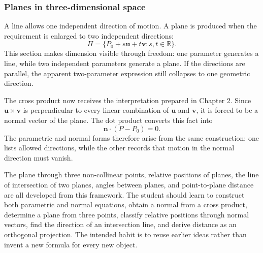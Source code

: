\subsubsection*{Planes in three-dimensional space}

A line allows one independent direction of motion. A plane is produced when the
requirement is enlarged to two independent directions:
\[
\Pi=\{P_0+s\mathbf u+t\mathbf v:s,t\in\mathbb R\}.
\]
This section makes dimension visible through freedom: one parameter generates a
line, while two independent parameters generate a plane. If the directions are
parallel, the apparent two-parameter expression still collapses to one geometric
direction.

The cross product now receives the interpretation prepared in Chapter 2. Since
$\mathbf u\times\mathbf v$ is perpendicular to every linear combination of
$\mathbf u$ and $\mathbf v$, it is forced to be a normal vector of the plane. The
dot product converts this fact into
\[
\mathbf n\cdot(P-P_0)=0.
\]
The parametric and normal forms therefore arise from the same construction: one
lists allowed directions, while the other records that motion in the normal
direction must vanish.

The plane through three non-collinear points, relative positions of planes, the
line of intersection of two planes, angles between planes, and point-to-plane
distance are all developed from this framework. The student should learn to
construct both parametric and normal equations, obtain a normal from a cross
product, determine a plane from three points, classify relative positions through
normal vectors, find the direction of an intersection line, and derive distance
as an orthogonal projection. The intended habit is to reuse earlier ideas rather
than invent a new formula for every new object.
